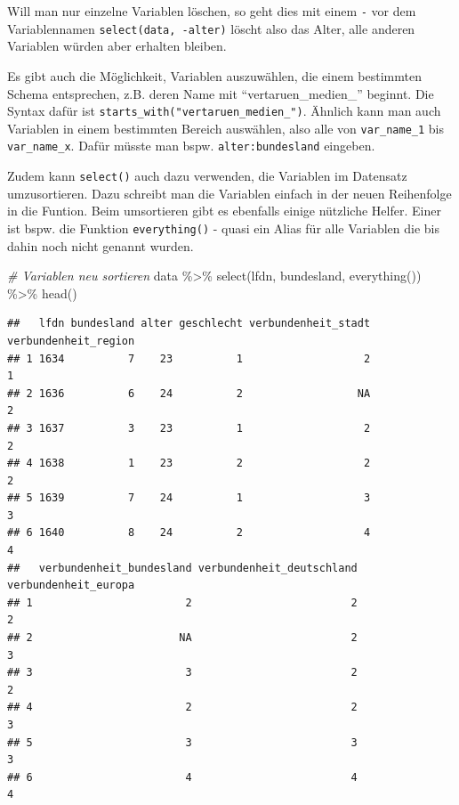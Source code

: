 \documentclass[
]{book}
\newenvironment{Shaded}{\begin{snugshade}}{\end{snugshade}}
\newcommand{\CommentTok}[1]{\textcolor[rgb]{0.56,0.35,0.01}{\textit{#1}}}
\newcommand{\FunctionTok}[1]{\textcolor[rgb]{0.00,0.00,0.00}{#1}}
\newcommand{\NormalTok}[1]{#1}
\newcommand{\SpecialCharTok}[1]{\textcolor[rgb]{0.00,0.00,0.00}{#1}}
\begin{document}
Will man nur einzelne Variablen löschen, so geht dies mit einem \texttt{-} vor dem Variablennamen \texttt{select(data,\ -alter)} löscht also das Alter, alle anderen Variablen würden aber erhalten bleiben.

Es gibt auch die Möglichkeit, Variablen auszuwählen, die einem bestimmten Schema entsprechen, z.B. deren Name mit ``vertaruen\_medien\_'' beginnt. Die Syntax dafür ist \texttt{starts\_with("vertaruen\_medien\_")}. Ähnlich kann man auch Variablen in einem bestimmten Bereich auswählen, also alle von \texttt{var\_name\_1} bis \texttt{var\_name\_x}. Dafür müsste man bspw. \texttt{alter:bundesland} eingeben.

Zudem kann \texttt{select()} auch dazu verwenden, die Variablen im Datensatz umzusortieren. Dazu schreibt man die Variablen einfach in der neuen Reihenfolge in die Funtion. Beim umsortieren gibt es ebenfalls einige nützliche Helfer. Einer ist bspw. die Funktion \texttt{everything()} - quasi ein Alias für alle Variablen die bis dahin noch nicht genannt wurden.

\begin{Shaded}
\begin{Highlighting}[]
\CommentTok{\# Variablen neu sortieren}
\NormalTok{data }\SpecialCharTok{\%\textgreater{}\%} 
  \FunctionTok{select}\NormalTok{(lfdn, bundesland, }\FunctionTok{everything}\NormalTok{()) }\SpecialCharTok{\%\textgreater{}\%} 
  \FunctionTok{head}\NormalTok{()}
\end{Highlighting}
\end{Shaded}

\begin{verbatim}
##   lfdn bundesland alter geschlecht verbundenheit_stadt verbundenheit_region
## 1 1634          7    23          1                   2                    1
## 2 1636          6    24          2                  NA                    2
## 3 1637          3    23          1                   2                    2
## 4 1638          1    23          2                   2                    2
## 5 1639          7    24          1                   3                    3
## 6 1640          8    24          2                   4                    4
##   verbundenheit_bundesland verbundenheit_deutschland verbundenheit_europa
## 1                        2                         2                    2
## 2                       NA                         2                    3
## 3                        3                         2                    2
## 4                        2                         2                    3
## 5                        3                         3                    3
## 6                        4                         4                    4
\end{verbatim}
\end{document}
